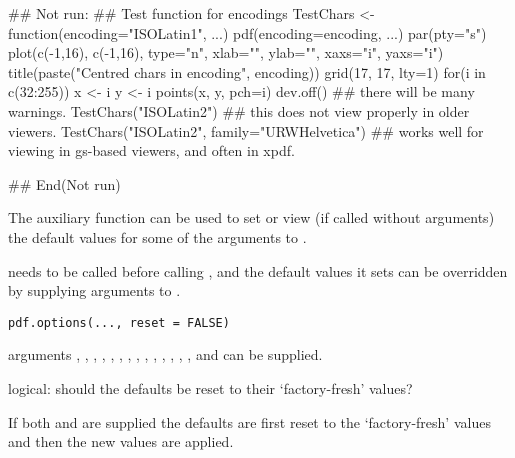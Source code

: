 %
\begin{Examples}
\begin{ExampleCode}
## Not run: 
## Test function for encodings
TestChars <- function(encoding="ISOLatin1", ...)
{
    pdf(encoding=encoding, ...)
    par(pty="s")
    plot(c(-1,16), c(-1,16), type="n", xlab="", ylab="",
         xaxs="i", yaxs="i")
         title(paste("Centred chars in encoding", encoding))
    grid(17, 17, lty=1)
    for(i in c(32:255)) {
        x <- i %
        y <- i %
        points(x, y, pch=i)
    }
    dev.off()
}
## there will be many warnings.
TestChars("ISOLatin2")
## this does not view properly in older viewers.
TestChars("ISOLatin2", family="URWHelvetica")
## works well for viewing in gs-based viewers, and often in xpdf.

## End(Not run)
\end{ExampleCode}
\end{Examples}
%
\begin{Description}\relax
The auxiliary function  can be used to set or view
(if called without arguments) the default values for some of the
arguments to .

 needs to be called before calling ,
and the default values it sets can be overridden by supplying
arguments to .

\end{Description}
%
\begin{Usage}
\begin{verbatim}
pdf.options(..., reset = FALSE)
\end{verbatim}
\end{Usage}
%
\begin{Arguments}
\begin{ldescription}
\item[\code{...}] arguments , , ,
, , , ,
, , , ,
, , ,
 and  can be supplied.
\item[\code{reset}] logical: should the defaults be reset to their
`factory-fresh' values?
\end{ldescription}
\end{Arguments}
%
\begin{Details}\relax
If both  and  are supplied the defaults
are first reset to the `factory-fresh' values and then the new
values are applied.
\end{Details}
